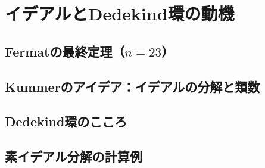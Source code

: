 \documentclass[11pt,b5paper,oneside,titlepage,lualatex]{ltjsreport}
\begin{document}
\clearpage


\chapter{イデアルとDedekind環の動機} \label{chap:イデアルとDedekind環の動機}






\section{Fermatの最終定理（$ n=23 $）} \label{sec:Fermatの最終定理（n=23）}





\section{Kummerのアイデア：イデアルの分解と類数} \label{secKummerのアイデア:}






\section{Dedekind環のこころ} \label{sec:Dedekind環のこころ}




\section{素イデアル分解の計算例} \label{sec:素イデアル分解の計算例}
\end{document}
